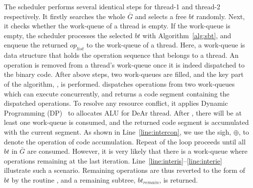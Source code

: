 The scheduler performs several identical steps for thread-1 and thread-2 respectively.
It firstly searches the whole $\bar{G}$ and selects a free $bt$ randomly.
Next, it checks whether the work-queue of a thread is empty.
If the work-queue is empty, the scheduler processes the selected $bt$ with Algorithm~\ref{alg:sbt}, 
and enqueue the returned $op_{list}$ to the work-queue of a thread.
Here, a work-queue is data structure that holds the operation sequence that belongs to a thread.
An operation is removed from a thread's work-queue once it is indeed dispatched to the binary code.
After above steps, two work-queues are filled, and the key part of the algorithm, , is performed.
 dispatches operations from two work-queues which can execute concurrently, 
and returns a code segment containing the dispatched operations.
To resolve any resource conflict, it applies Dynamic Programming (DP)~\cite{dp} to allocates ALU for DeAr thread.
After , there will be at least one work-queue is consumed, 
and the returned code segment is accumulated with the current segment.
As shown in Line~\ref{line:intercon}, we use the sigh, $\oplus$, to denote the operation of code accumulation.
Repeat of the loop proceeds until all $bt$ in $\bar{G}$ are consumed.
However, it is very likely that there is a work-queue where operations remaining at the last iteration.
Line~\ref{line:interis}--\ref{line:interie} illustrate such a scenario.
Remaining operations are thus reverted to the form of $bt$ by the routine ,
and a remaining subtree, $bt_{remain}$, is returned.
